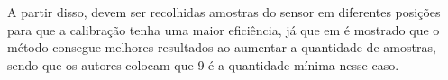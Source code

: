 \documentclass[acronym, symbols, table, deposito]{fei}
\begin{document}
			A partir disso, devem ser recolhidas amostras do sensor em diferentes posições para que a calibração tenha uma maior eficiência, já que em \textcite{menezes2020triaxial} é mostrado que o método consegue melhores resultados ao aumentar a quantidade de amostras, sendo que os autores colocam que 9 é a quantidade mínima nesse caso.
			
%			
%			
%			
			
\end{document}
